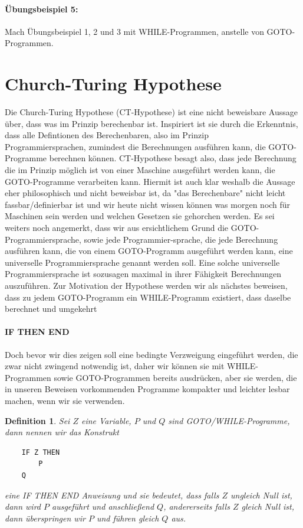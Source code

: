 \documentclass[11pt,a4paper,leqno]{report}
\newtheorem{definition}[theorem]{Definition}
\numberwithin{equation}{chapter}
\begin{document}
\paragraph{\"Ubungsbeispiel 5:} Mach \"Ubungsbeispiel 1, 2 und 3 mit WHILE-Programmen, anstelle von GOTO-Programmen.
\section{Church-Turing Hypothese}
Die Church-Turing Hypothese (CT-Hypothese) ist eine nicht beweisbare Aussage \"uber, dass was im Prinzip berechenbar ist. Inspiriert ist sie durch die Erkenntnis, dass alle Defintionen des Berechenbaren, also im Prinzip \\Programmiersprachen, zumindest die Berechnungen ausf\"uhren kann, die GOTO-Programme berechnen k\"onnen. CT-Hypothese besagt also, dass jede Berechnung die im Prinzip m\"oglich ist von einer Maschine ausgef\"uhrt werden kann, die GOTO-Programme verarbeiten kann. Hiermit ist auch klar weshalb die Aussage eher philosophisch und nicht beweisbar ist, da "das Berechenbare" nicht leicht fassbar/definierbar ist und wir heute nicht wissen k\"onnen was morgen noch f\"ur Maschinen sein werden und welchen Gesetzen sie gehorchen werden. Es sei weiters noch angemerkt, dass wir aus ersichtlichem Grund die GOTO-Programmiersprache, sowie jede Programmier-sprache, die jede Berechnung ausf\"uhren kann, die von einem GOTO-Programm ausgef\"uhrt werden kann, eine universelle Programmiersprache genannt werden soll. Eine solche universelle Programmiersprache ist sozusagen maximal in ihrer F\"ahigkeit Berechnungen auszuf\"uhren. Zur Motivation der Hypothese werden wir als n\"achstes beweisen, dass zu jedem GOTO-Programm ein WHILE-Programm existiert, dass daselbe berechnet und umgekehrt
\paragraph{IF THEN END} Doch bevor wir dies zeigen soll eine bedingte Verzweigung eingef\"uhrt werden, die zwar nicht zwingend notwendig ist, daher wir k\"onnen sie mit WHILE-Programmen sowie GOTO-Programmen bereits ausdr\"ucken, aber sie werden, die in unseren Beweisen vorkommenden Programme kompakter und leichter lesbar machen, wenn wir sie verwenden.
\begin{definition}
Sei $Z$ eine Variable, $P$ und $Q$ sind GOTO/WHILE-Programme, dann nennen wir das Konstrukt
	\begin{lstlisting}
	IF Z THEN
		P
	Q
	\end{lstlisting}
eine IF THEN END Anweisung und sie bedeutet, dass falls $Z$ ungleich Null ist, dann wird $P$ ausgef\"uhrt und anschlie\ss{}end $Q$, andererseits falls $Z$ gleich Null ist, dann \"uberspringen wir $P$ und f\"uhren gleich $Q$ aus.
\end{definition}
\end{document}
